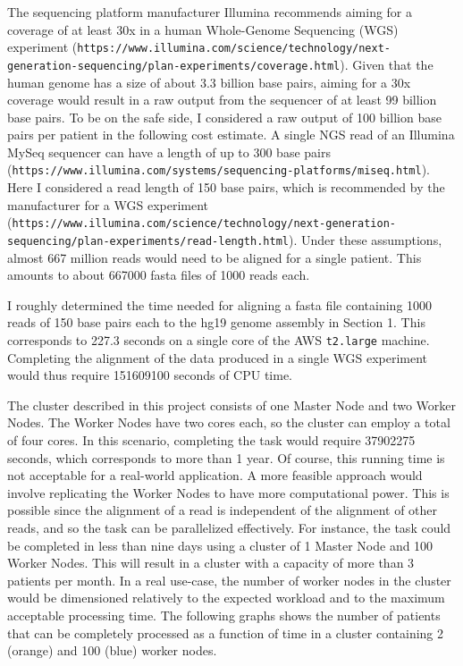 \documentclass{article}
\begin{document}
The sequencing platform manufacturer Illumina recommends aiming for a coverage of at least 30x in a human Whole-Genome Sequencing (WGS) experiment (\texttt{https://www.illumina.com/science/technology/next-generation-sequencing/plan-experiments/coverage.html}).
Given that the human genome has a size of about 3.3 billion base pairs, aiming for a 30x coverage would result in a raw output from the sequencer of at least 99 billion base pairs.
To be on the safe side, I considered a raw output of 100 billion base pairs per patient in the following cost estimate.
A single NGS read of an Illumina MySeq sequencer can have a length of up to 300 base pairs (\texttt{https://www.illumina.com/systems/sequencing-platforms/miseq.html}). Here I considered a read length of 150 base pairs, which is recommended by the manufacturer for a WGS experiment (\texttt{https://www.illumina.com/science/technology/next-generation-sequencing/plan-experiments/read-length.html}).
Under these assumptions, almost 667 million reads would need to be aligned for a single patient.
This amounts to about 667000 fasta files of 1000 reads each.

I roughly determined the time needed for aligning a fasta file containing 1000 reads of 150 base pairs each to the hg19 genome assembly in Section 1.
This corresponds to 227.3 seconds on a single core of the AWS \texttt{t2.large} machine.
Completing the alignment of the data produced in a single WGS experiment would thus require 151609100 seconds of CPU time.

The cluster described in this project consists of one Master Node and two Worker Nodes.
The Worker Nodes have two cores each, so the cluster can employ a total of four cores.
In this scenario, completing the task would require 37902275 seconds, which corresponds to more than 1 year.
Of course, this running time is not acceptable for a real-world application.
A more feasible approach would involve replicating the Worker Nodes to have more computational power.
This is possible since the alignment of a read is independent of the alignment of other reads, and so the task can be parallelized effectively.
For instance, the task could be completed in less than nine days using a cluster of 1 Master Node and 100 Worker Nodes.
This will result in a cluster with a capacity of more than 3 patients per month.
In a real use-case, the number of worker nodes in the cluster would be dimensioned relatively to the expected workload and to the maximum acceptable processing time.
The following graphs shows the number of patients that can be completely processed as a function of time in a cluster containing 2 (orange) and 100 (blue) worker nodes.
\end{document}
